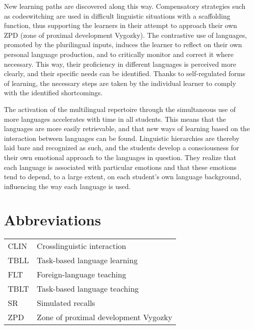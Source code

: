 \documentclass[output=paper]{../langscibook}
\begin{document}
New learning paths are discovered along this way. Compensatory strategies such as codeswitching are used in difficult linguistic situations with a scaffolding function, thus supporting the learners in their attempt to approach their own ZPD (zone of proximal development Vygozky). The contrastive use of languages, promoted by the plurilingual inputs, induces the learner to reflect on their own personal language production, and to critically monitor and correct it where necessary. This way, their proficiency in different languages is perceived more clearly, and their specific needs can be identified. Thanks to self-regulated forms of learning, the necessary steps are taken by the individual learner to comply with the identified shortcomings. 

The activation of the multilingual repertoire through the simultaneous use of more languages accelerates with time in all students. This means that the languages are more easily retrievable, and that new ways of learning based on the interaction between languages can be found. Linguistic hierarchies are thereby laid bare and recognized as such, and the students develop a consciousness for their own emotional approach to the languages in question. They realize that each language is associated with particular emotions and that these emotions tend to depend, to a large extent, on each student’s own language background, influencing the way each language is used.


\section[*]{Abbreviations}
\label{sec:abbreviations}

\begin{tabular}{@{}ll}
CLIN & Crosslinguistic interaction\\
TBLL & Task-based language learning\\
FLT & Foreign-language teaching\\
TBLT & Task-based language teaching\\
SR & Simulated recalls\\
ZPD & Zone of proximal development Vygozky\\
\end{tabular}

{\sloppy\printbibliography[heading=subbibliography,notkeyword=this]}
\end{document}
